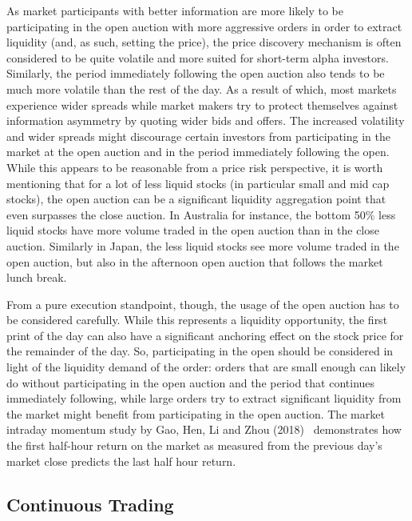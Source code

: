 As market participants with better information are more likely to be participating in the open auction with more aggressive orders in order to extract liquidity (and, as such, setting the price), the price discovery mechanism is often considered to be quite volatile and more suited for short-term alpha investors. Similarly, the period immediately following the open auction also tends to be much more volatile than the rest of the day. As a result of which, most markets experience wider spreads while market makers try to protect themselves against information asymmetry by quoting wider bids and offers. The increased volatility and wider spreads might discourage certain investors from participating in the market at the open auction and in the period immediately following the open. While this appears to be reasonable from a price risk perspective, it is worth mentioning that for a lot of less liquid stocks (in particular small and mid cap stocks), the open auction can be a significant liquidity aggregation point that even surpasses the close auction. In Australia for instance, the bottom 50\% less liquid stocks have more volume traded in the open auction than in the close auction. Similarly in Japan, the less liquid stocks see more volume traded in the open auction, but also in the afternoon open auction that follows the market lunch break. \twomedskip


From a pure execution standpoint, though, the usage of the open auction has to be considered carefully. While this represents a liquidity opportunity, the first print of the day can also have a significant anchoring effect on the stock price for the remainder of the day. So, participating in the open should be considered in light of the liquidity demand of the order: orders that are small enough can likely do without participating in the open auction and the period that continues immediately following, while large orders try to extract significant liquidity from the market might benefit from participating in the open auction. The market intraday momentum study by Gao, Hen, Li and Zhou (2018)~\cite{ghliz} demonstrates how the first half-hour return on the market as measured from the previous day's market close predicts the last half hour return.



\subsection{Continuous Trading} 


